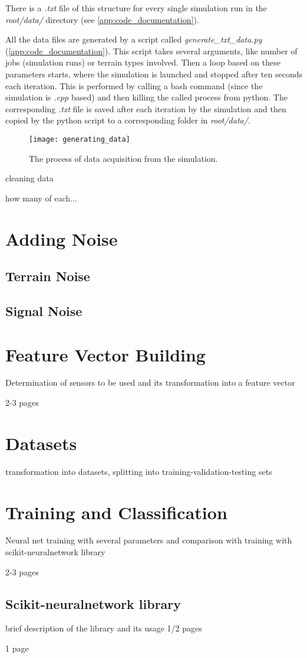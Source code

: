 There is a \textit{.txt} file of this structure for every single simulation run in the \textit{root/data/} directory (see \cref{app:code_documentation}).

All the data files are generated by a script called \textit{generate\_txt\_data.py} (\ref{app:code_documentation}). This script takes several arguments, like number of jobs (simulation runs) or terrain types involved. Then a loop based on these parameters starts, where the simulation is launched and stopped after ten seconds each iteration. This is performed by calling a bash command (since the simulation is \textit{.cpp} based) and then killing the called process from python. The corresponding \textit{.txt} file is saved after each iteration by the simulation and then copied by the python script to a corresponding folder in \textit{root/data/}.

\begin{figure}[H]
  \centering
  \texttt{[image: generating\_data]}
  \caption{The process of data acquisition from the simulation.}
  \label{img:generating_data}
\end{figure}

cleaning data

how many of each...

\section{Adding Noise}

\subsection{Terrain Noise} \label{ssec:terrain_noise}

\subsection{Signal Noise} \label{ssec:signal_noise}

\section{Feature Vector Building} \label{sec:feature_vector_building}
Determination of sensors to be used and its transformation into a feature vector

2-3 pages

\section{Datasets}
transformation into datasets, splitting into training-validation-testing sets

\section{Training and Classification}

Neural net training with several parameters and comparison with training with scikit-neuralnetwork library

2-3 pages

\subsection{Scikit-neuralnetwork library}
brief description of the library and its usage 1/2 pages

1 page